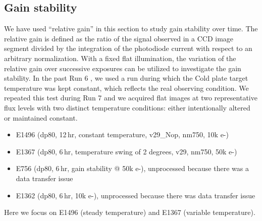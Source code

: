 \subsection{Gain stability}\label{sec:gain-stability-2}
We have used ``relative gain'' in this section to study gain stability over time. 
The relative gain is defined as the ratio of the signal observed in a CCD image segment divided by the integration of the photodiode current with respect to an arbitrary normalization.
With a fixed flat illumination, the variation of the relative gain over successive exposures can be utilized to investigate the gain stability. 
In the past Run 6 \citep{2024SPIE13103E..0WU}, we used a run during which the Cold plate target temperature was kept constant, which reflects the real observing condition. We repeated this test during Run 7 and we acquired flat images at two representative flux levels with two distinct temperature conditions: either intentionally altered or maintained constant.
\begin{itemize}
    \item E1496 (dp80, 12\,hr, constant temperature, v29\_Nop, nm750, 10k e-)
    \item E1367 (dp80, 6\,hr, temperature swing of 2 degrees, v29, nm750, 50k e-)
    \item E756 (dp80, 6\,hr, gain stability @ 50k e-), unprocessed because there was a data transfer issue
    \item E1362 (dp80, 6\,hr, 10k e-), unprocessed because there was data transfer issue
\end{itemize}

Here we focus on E1496 (steady temperature) and E1367 (variable temperature).

